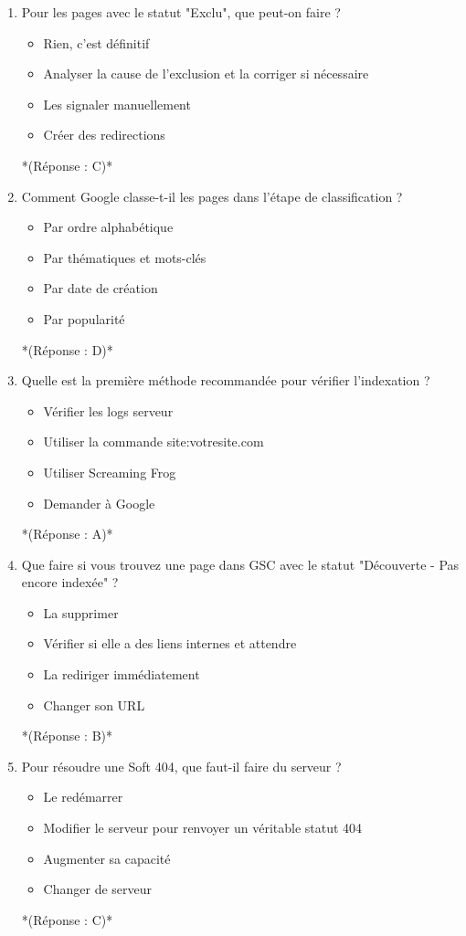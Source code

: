 \documentclass[12pt,a4paper,twoside]{report}
\begin{document}
\begin{enumerate}
\item Pour les pages avec le statut "Exclu", que peut-on faire ?
\begin{itemize}
\item[A)] Rien, c'est définitif
\item[B)] Analyser la cause de l'exclusion et la corriger si nécessaire
\item[C)] Les signaler manuellement
\item[D)] Créer des redirections
\end{itemize}
*(Réponse : C)*

\item Comment Google classe-t-il les pages dans l'étape de classification ?
\begin{itemize}
\item[A)] Par ordre alphabétique
\item[B)] Par thématiques et mots-clés
\item[C)] Par date de création
\item[D)] Par popularité
\end{itemize}
*(Réponse : D)*

\item Quelle est la première méthode recommandée pour vérifier l'indexation ?
\begin{itemize}
\item[A)] Vérifier les logs serveur
\item[B)] Utiliser la commande site:votresite.com
\item[C)] Utiliser Screaming Frog
\item[D)] Demander à Google
\end{itemize}
*(Réponse : A)*

\item Que faire si vous trouvez une page dans GSC avec le statut "Découverte - Pas encore indexée" ?
\begin{itemize}
\item[A)] La supprimer
\item[B)] Vérifier si elle a des liens internes et attendre
\item[C)] La rediriger immédiatement
\item[D)] Changer son URL
\end{itemize}
*(Réponse : B)*

\item Pour résoudre une Soft 404, que faut-il faire du serveur ?
\begin{itemize}
\item[A)] Le redémarrer
\item[B)] Modifier le serveur pour renvoyer un véritable statut 404
\item[C)] Augmenter sa capacité
\item[D)] Changer de serveur
\end{itemize}
*(Réponse : C)*


\end{enumerate}
\end{document}
